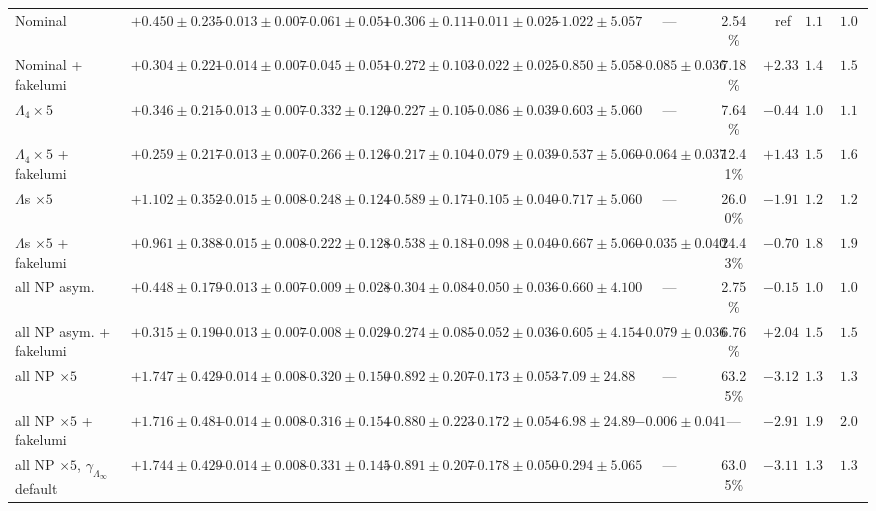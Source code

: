 \documentclass[landscape]{article}
\begin{document}
\begin{table}[h]
{\begin{tabular}{lccccccccrrr}
    \hline
    Nominal & $+0.450\pm0.235$ & $-0.013\pm0.007$ & $-0.061\pm0.051$ & $+0.306\pm0.111$ & $-0.011\pm0.025$ & $-1.022\pm5.057$ & --- & 2.54\% & ref & $1.103$ & $1.089$ \\
    Nominal + fakelumi & $+0.304\pm0.221$ & $-0.014\pm0.007$ & $-0.045\pm0.051$ & $+0.272\pm0.103$ & $-0.022\pm0.025$ & $-0.850\pm5.058$ & $-0.085\pm0.036$ & 7.18\% & $+2.33$ & $1.471$ & $1.521$ \\
    \hline
    $\Lambda_4 \times 5$ & $+0.346\pm0.215$ & $-0.013\pm0.007$ & $-0.332\pm0.120$ & $+0.227\pm0.105$ & $-0.086\pm0.039$ & $-0.603\pm5.060$ & --- & 7.64\% & $-0.44$ & $1.094$ & $1.107$ \\
    $\Lambda_4 \times 5$ + fakelumi & $+0.259\pm0.217$ & $-0.013\pm0.007$ & $-0.266\pm0.126$ & $+0.217\pm0.104$ & $-0.079\pm0.039$ & $-0.537\pm5.060$ & $-0.064\pm0.037$ & 12.41\% & $+1.43$ & $1.543$ & $1.610$ \\
    \hline
    $\Lambda$s $\times 5$ & $+1.102\pm0.352$ & $-0.015\pm0.008$ & $-0.248\pm0.124$ & $+0.589\pm0.171$ & $-0.105\pm0.040$ & $-0.717\pm5.060$ & --- & 26.00\% & $-1.91$ & $1.226$ & $1.249$ \\
    $\Lambda$s $\times 5$ + fakelumi & $+0.961\pm0.388$ & $-0.015\pm0.008$ & $-0.222\pm0.128$ & $+0.538\pm0.181$ & $-0.098\pm0.040$ & $-0.667\pm5.060$ & $-0.035\pm0.040$ & 24.43\% & $-0.70$ & $1.846$ & $1.918$ \\
    \hline
    all NP asym. & $+0.448\pm0.179$ & $-0.013\pm0.007$ & $-0.009\pm0.028$ & $+0.304\pm0.084$ & $-0.050\pm0.036$ & $-0.660\pm4.100$ & --- & 2.75\% & $-0.15$ & $1.080$ & $1.089$ \\
    all NP asym. + fakelumi & $+0.315\pm0.190$ & $-0.013\pm0.007$ & $-0.008\pm0.029$ & $+0.274\pm0.085$ & $-0.052\pm0.036$ & $-0.605\pm4.154$ & $-0.079\pm0.036$ & 6.76\% & $+2.04$ & $1.503$ & $1.521$ \\
    \hline
    all NP $\times 5$ & $+1.747\pm0.429$ & $-0.014\pm0.008$ & $-0.320\pm0.150$ & $+0.892\pm0.207$ & $-0.173\pm0.053$ & $-7.09\pm24.88$ & --- & 63.25\% & $-3.12$ & $1.302$ & $1.323$ \\
    all NP $\times 5$ + fakelumi & $+1.716\pm0.481$ & $-0.014\pm0.008$ & $-0.316\pm0.154$ & $+0.880\pm0.223$ & $-0.172\pm0.054$ & $-6.98\pm24.89$ & $-0.006\pm0.041$ & --- & $-2.91$ & $1.989$ & $2.087$ \\
    \hline
    all NP $\times 5$, $\gamma_{\Lambda_\infty}$ default & $+1.744\pm0.429$ & $-0.014\pm0.008$ & $-0.331\pm0.145$ & $+0.891\pm0.207$ & $-0.178\pm0.050$ & $-0.294\pm5.065$ & --- & 63.05\% & $-3.11$ & $1.302$ & $1.323$ \\

\end{tabular}}
\end{table}
\end{document}
